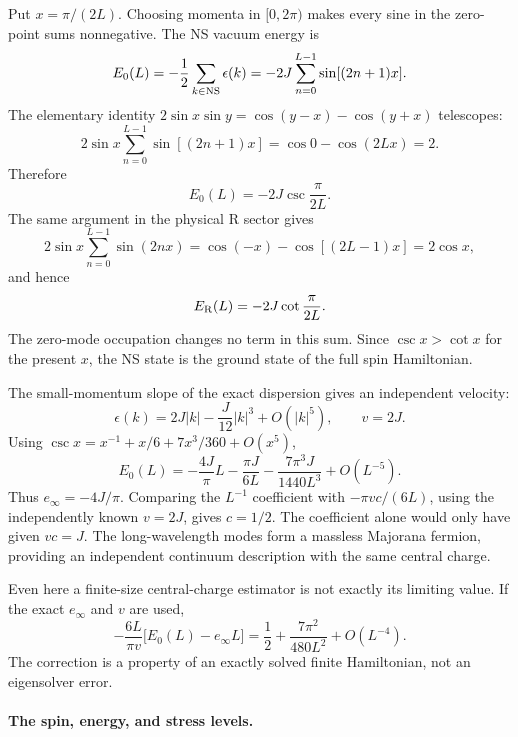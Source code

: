 \begin{example}
Put $x=\pi/(2L)$. Choosing momenta in $[0,2\pi)$ makes every
sine in the zero-point sums nonnegative. The NS vacuum energy is
\[
 E_0(L)=-\frac12\sum_{k\in{\rm NS}}\epsilon(k)
        =-2J\sum_{n=0}^{L-1}\sin[(2n+1)x].
\]
The elementary identity
$2\sin x\sin y=\cos(y-x)-\cos(y+x)$ telescopes:
\[
 2\sin x\sum_{n=0}^{L-1}\sin[(2n+1)x]
 =\cos0-\cos(2Lx)=2.
\]
Therefore
\begin{equation}
 E_0(L)=-2J\csc\frac{\pi}{2L}.
 \label{eq:scaling-Ising-E0}
\end{equation}
The same argument in the physical R sector gives
\[
 2\sin x\sum_{n=0}^{L-1}\sin(2nx)
 =\cos(-x)-\cos[(2L-1)x]=2\cos x,
\]
and hence
\begin{equation}
 E_{\rm R}(L)=-2J\cot\frac{\pi}{2L}.
 \label{eq:scaling-Ising-ER}
\end{equation}
The zero-mode occupation changes no term in this sum.
Since $\csc x>\cot x$ for the present $x$, the NS state is the
ground state of the full spin Hamiltonian.

The small-momentum slope of the exact dispersion gives an
independent velocity:
\[
 \epsilon(k)=2J|k|-\frac J{12}|k|^3+O(|k|^5),
 \qquad v=2J.
\]
Using $\csc x=x^{-1}+x/6+7x^3/360+O(x^5)$,
\begin{equation}
 E_0(L)=-\frac{4J}{\pi}L-\frac{\pi J}{6L}
        -\frac{7\pi^3J}{1440L^3}+O(L^{-5}).
 \label{eq:scaling-Ising-Casimir}
\end{equation}
Thus $e_\infty=-4J/\pi$. Comparing the $L^{-1}$ coefficient
with $-\pi vc/(6L)$, using the independently known $v=2J$,
gives $c=1/2$. The coefficient alone would only have given
$vc=J$. The long-wavelength modes form a massless Majorana
fermion, providing an independent continuum description with
the same central charge.

Even here a finite-size central-charge estimator is not exactly
its limiting value. If the exact $e_\infty$ and $v$ are used,
\[
 -\frac{6L}{\pi v}\bigl[E_0(L)-e_\infty L\bigr]
 =\frac12+\frac{7\pi^2}{480L^2}+O(L^{-4}).
\]
The correction is a property of an exactly solved finite
Hamiltonian, not an eigensolver error.

\paragraph{The spin, energy, and stress levels.}


\end{example}

